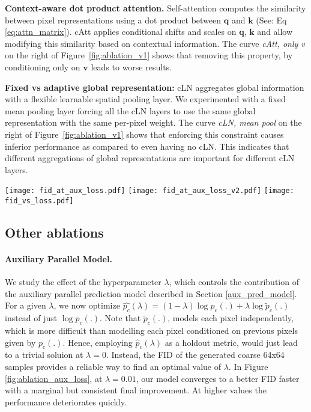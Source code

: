 \documentclass{article} \usepackage{iclr2021_conference,times}
\newcommand{\bb}[1]{\mathbf{#1}}
\newcommand{\bv}{\bb{v}}
\newcommand{\bk}{\bb{k}}
\newcommand{\bq}{\bb{q}}
\begin{document}
\textbf{Context-aware dot product attention.} Self-attention computes the similarity between pixel representations using a dot product between $\bq$ and $\bk$ (See: Eq~ \ref{eq:attn_matrix}). cAtt applies conditional shifts and scales on $\bq$, $\bk$ and allow modifying this similarity based on contextual information. The curve \textit{cAtt, only v} on the right of Figure~\ref{fig:ablation_v1} shows that removing this property, by conditioning only on $\bv$ leads to worse results.

\textbf{Fixed vs adaptive global representation:} cLN aggregates global information with a flexible learnable spatial pooling layer. We experimented with a fixed mean pooling layer forcing all the cLN layers to use the same global representation with the same per-pixel weight. The curve \textit{cLN, mean pool} on the right of Figure~\ref{fig:ablation_v1} shows that enforcing this constraint causes inferior performance as compared to even having no cLN. This indicates that different aggregations of global representations are important for different cLN layers.

\begin{figure*}
\centering
\texttt{[image: fid\_at\_aux\_loss.pdf]} \hfill
\texttt{[image: fid\_at\_aux\_loss\_v2.pdf]} \hfill
\texttt{[image: fid\_vs\_loss.pdf]}

\caption{\textbf{Left:} FID of generated 64 $\times$ 64 coarse samples as a function of training steps for $\lambda=0.01$ and $\lambda=0.0$. \textbf{Center:} Final FID scores as a function of $\lambda$. \textbf{Right:} FID as a function of log-likelihood.}
\label{fig:ablation_aux_loss}
\end{figure*}

\subsection{Other ablations}
\label{other_ablations}

\paragraph{Auxiliary Parallel Model.} We study the effect of the hyperparameter $\lambda$, which controls the contribution of the auxiliary parallel prediction model described in Section \ref{aux_pred_model}. For a given $\lambda$, we now optimize $\hat{p_{c}}(\lambda) = (1 - \lambda)\log p_{c}(.) + \lambda \log \widetilde{p}_c(.)$ instead of just $\log p_c(.)$. Note that $\widetilde{p}_c(.)$, models each pixel independently, which is more difficult than modelling each pixel conditioned on previous pixels given by $p_{c}(.)$. Hence, employing $\hat{p}_{c}(\lambda)$ as a holdout metric, would just lead to a trivial soluion at $\lambda=0$. Instead, the FID of the generated coarse 64x64 samples provides a reliable way to find an optimal value of $\lambda$. In Figure \ref{fig:ablation_aux_loss}, at $\lambda=0.01$, our model converges to a better FID faster with a marginal but consistent final improvement. At higher values the performance deteriorates quickly.
\end{document}
